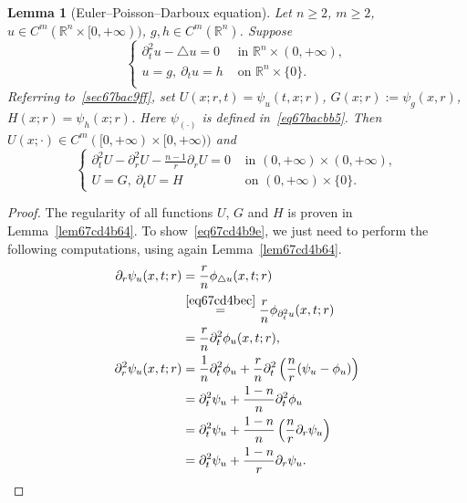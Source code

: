 \documentclass[a4paper,9pt]{amsart}
\newcommand{\R}{\mathbb{R}}	%
\newcommand{\de}{\partial}		%
\newcommand{\laplacian}{\triangle}
\theoremstyle{plain}
\newtheorem{lemma}[proposition]{Lemma}
\theoremstyle{definition}
\theoremstyle{remark}
\begin{document}
\begin{lemma}[Euler--Poisson--Darboux equation]\label{lem67cd498e}
	Let $n\ge2$, $m\ge 2$, $u\in C^m(\R^n\times[0,+\infty))$, $g,h\in C^m(\R^n)$.
	Suppose
	\begin{equation}\label{eq67cd4bec}
	\begin{cases}
		\de_t^2u-\laplacian u = 0 & \text{ in }\R^n\times(0,+\infty) , \\
		u = g,\ \de_t u = h & \text{ on }\R^n\times\{0\} . \\
	\end{cases}
	\end{equation}
	Referring to~\ref{sec67bac9ff},
	set $U(x;r,t) = \psi_u(t,x;r)$, $G(x;r):= \psi_g(x,r)$, $H(x;r) = \psi_h(x;r)$.
	Here $\psi_{(\cdot)}$ is defined in~\eqref{eq67bacbb5}.
	Then $U(x;\cdot)\in C^m([0,+\infty)\times[0,+\infty))$ and
	\begin{equation}\label{eq67cd4b9e}
	\begin{cases}
		\de_t^2 U - \de_r^2 U - \frac{n-1}{r} \de_r U = 0 & \text{ in }(0,+\infty)\times(0,+\infty) , \\
		U = G,\ \de_t U = H & \text{ on }(0,+\infty)\times\{0\} .
	\end{cases}
	\end{equation}
\end{lemma}
\begin{proof}
	The regularity of all functions $U$, $G$ and $H$ is proven in Lemma~\ref{lem67cd4b64}.
	To show~\eqref{eq67cd4b9e}, we just need to perform the following computations, using again Lemma~\ref{lem67cd4b64}.
	\begin{align}
		\de_r\psi_u(x,t;r) 
		&= \frac{r}{n} \phi_{\laplacian u} (x,t;r) \\
		&\overset{\eqref{eq67cd4bec}}= \frac{r}{n} \phi_{\de_t^2 u} (x,t;r) \\
		&= \frac{r}{n} \de_t^2 \phi_u(x,t;r) , \\
		\de_r^2\psi_u(x,t;r)
		&= \frac1n \de_t^2\phi_u + \frac{r}{n} \de_t^2\left( \frac{n}{r}(\psi_u-\phi_u)\right) \\
		&= \de_t^2 \psi_u + \frac{1-n}{n} \de_t^2\phi_u \\
		&= \de_t^2 \psi_u + \frac{1-n}{n} \left(\frac{n}{r} \de_r\psi_u \right) \\
		&= \de_t^2 \psi_u + \frac{1-n}{r} \de_r \psi_u .
	\end{align}
\end{proof}

\end{document}
